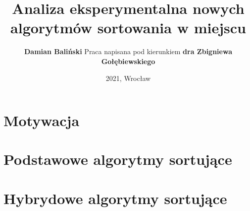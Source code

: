 \documentclass[xcolor=dvipsnames]{beamer}
\title{Analiza eksperymentalna nowych algorytmów sortowania w miejscu}
\author{
	\textbf{Damian Baliński}
	\newline \newline
	Praca napisana pod kierunkiem 
	\newline
	\textbf{dra Zbigniewa Gołębiewskiego}
}
\date{2021, Wrocław}
\begin{document}
\begin{frame}[plain]{}
	\titlepage
\end{frame}

\section{Motywacja}


\section{Podstawowe algorytmy sortujące}



\section{Hybrydowe algorytmy sortujące}








\end{document}
